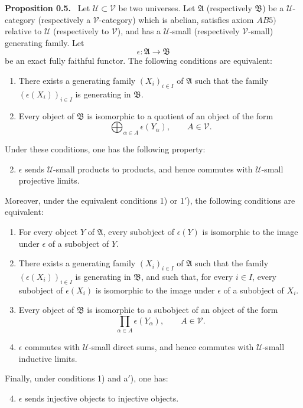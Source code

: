 \documentclass[11pt]{article}
\newcommand{\U}{\mathcal{U}}
\newcommand{\V}{\mathcal{V}}
\newcommand{\A}{\mathfrak{A}}
\newcommand{\B}{\mathfrak{B}}
\newenvironment{statement}[1]{\par\medskip\noindent\textbf{#1.}\ }{\par\medskip}
\begin{document}
\begin{statement}{Proposition 0.5}
Let $\U\subset \V$ be two universes. Let $\A$ (respectively $\B$) be a $\U$-category (respectively a $\V$-category) which is abelian, satisfies axiom $AB5)$ relative to $\U$ (respectively to $\V$), and has a $\U$-small (respectively $\V$-small) generating family. Let
\[
\epsilon:\A\longrightarrow \B
\]
be an exact fully faithful functor. The following conditions are equivalent:
\begin{enumerate}[label=\arabic*)]
\item There exists a generating family $(X_i)_{i\in I}$ of $\A$ such that the family $(\epsilon(X_i))_{i\in I}$ is generating in $\B$.
\item[1$'$)] Every object of $\B$ is isomorphic to a quotient of an object of the form
\[
\bigoplus_{\alpha\in A}\epsilon(Y_\alpha),\qquad A\in\V.
\]
\end{enumerate}
Under these conditions, one has the following property:
\begin{enumerate}[label=\arabic*)]
\setcounter{enumi}{1}
\item $\epsilon$ sends $\U$-small products to products, and hence commutes with $\U$-small projective limits.
\end{enumerate}
Moreover, under the equivalent conditions 1) or 1$'$), the following conditions are equivalent:
\begin{enumerate}[label=\alph*)]
\item For every object $Y$ of $\A$, every subobject of $\epsilon(Y)$ is isomorphic to the image under $\epsilon$ of a subobject of $Y$.
\item[a$'$)] There exists a generating family $(X_i)_{i\in I}$ of $\A$ such that the family $(\epsilon(X_i))_{i\in I}$ is generating in $\B$, and such that, for every $i\in I$, every subobject of $\epsilon(X_i)$ is isomorphic to the image under $\epsilon$ of a subobject of $X_i$.
\item Every object of $\B$ is isomorphic to a subobject of an object of the form
\[
\prod_{\alpha\in A}\epsilon(Y_\alpha),\qquad A\in\V.
\]
\item $\epsilon$ commutes with $\U$-small direct sums, and hence commutes with $\U$-small inductive limits.
\end{enumerate}
Finally, under conditions 1) and a$'$), one has:
\begin{enumerate}[label=\alph*)]
\setcounter{enumi}{3}
\item $\epsilon$ sends injective objects to injective objects.
\end{enumerate}
\end{statement}
\end{document}
